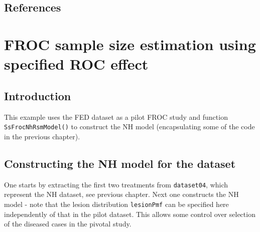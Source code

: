 \documentclass[
]{book}
\newenvironment{Shaded}{\begin{snugshade}}{\end{snugshade}}
\newcommand{\DataTypeTok}[1]{\textcolor[rgb]{0.13,0.29,0.53}{#1}}
\newcommand{\DecValTok}[1]{\textcolor[rgb]{0.00,0.00,0.81}{#1}}
\newcommand{\FloatTok}[1]{\textcolor[rgb]{0.00,0.00,0.81}{#1}}
\newcommand{\KeywordTok}[1]{\textcolor[rgb]{0.13,0.29,0.53}{\textbf{#1}}}
\newcommand{\NormalTok}[1]{#1}
\newcommand{\OperatorTok}[1]{\textcolor[rgb]{0.81,0.36,0.00}{\textbf{#1}}}
\newcommand{\StringTok}[1]{\textcolor[rgb]{0.31,0.60,0.02}{#1}}
\begin{document}
\hypertarget{references-8}{%
\section{References}\label{references-8}}

\hypertarget{SSFroc2}{%
\chapter{FROC sample size estimation using specified ROC effect}\label{SSFroc2}}

\hypertarget{introduction-13}{%
\section{Introduction}\label{introduction-13}}

This example uses the FED dataset as a pilot FROC study and function \texttt{SsFrocNhRsmModel()} to construct the NH model (encapsulating some of the code in the previous chapter).

\hypertarget{constructing-the-nh-model-for-the-dataset}{%
\section{Constructing the NH model for the dataset}\label{constructing-the-nh-model-for-the-dataset}}

One starts by extracting the first two treatments from \texttt{dataset04}, which represent the NH dataset, see previous chapter. Next one constructs the NH model - note that the lesion distribution \texttt{lesionPmf} can be specified here independently of that in the pilot dataset. This allows some control over selection of the diseased cases in the pivotal study.

\begin{Shaded}
\end{Shaded}
\end{document}

